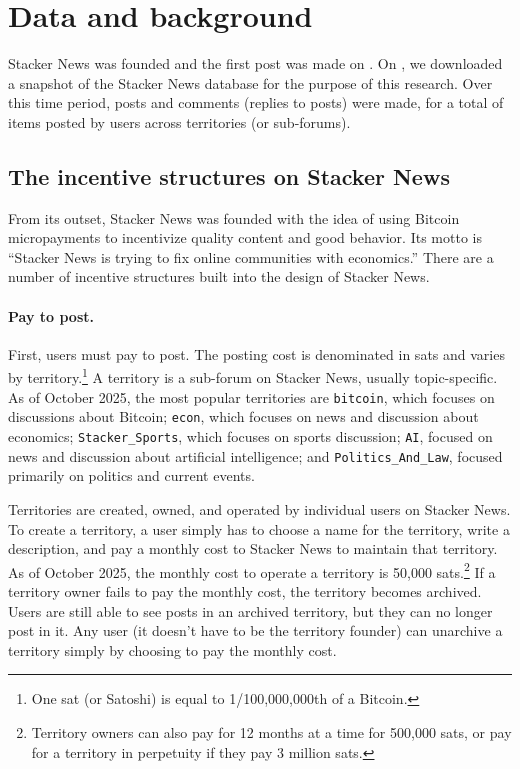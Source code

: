 \section{Data and background} \label{sec_data}

Stacker News was founded and the first post was made on . On , we downloaded a snapshot of the Stacker News database for the purpose of this research. Over this time period,  posts and  comments (replies to posts) were made, for a total of  items posted by  users across  territories (or sub-forums). 

\subsection*{The incentive structures on Stacker News}

From its outset, Stacker News was founded with the idea of using Bitcoin micropayments to incentivize quality content and good behavior. Its motto is ``Stacker News is trying to fix online communities with economics.'' There are a number of incentive structures built into the design of Stacker News. 

\paragraph{Pay to post.} First, users must pay to post. The posting cost is denominated in sats and varies by territory.\footnote{One sat (or Satoshi) is equal to 1/100,000,000th of a Bitcoin.} A territory is a sub-forum on Stacker News, usually topic-specific. As of October 2025, the most popular territories are \texttt{bitcoin}, which focuses on discussions about Bitcoin; \texttt{econ}, which focuses on news and discussion about economics; \texttt{Stacker\_Sports}, which focuses on sports discussion; \texttt{AI}, focused on news and discussion about artificial intelligence; and \texttt{Politics\_And\_Law}, focused primarily on politics and current events. 

Territories are created, owned, and operated by individual users on Stacker News. To create a territory, a user simply has to choose a name for the territory, write a description, and pay a monthly cost to Stacker News to maintain that territory. As of October 2025, the monthly cost to operate a territory is 50,000 sats.\footnote{Territory owners can also pay for 12 months at a time for 500,000 sats, or pay for a territory in perpetuity if they pay 3 million sats.} If a territory owner fails to pay the monthly cost, the territory becomes archived. Users are still able to see posts in an archived territory, but they can no longer post in it. Any user (it doesn't have to be the territory founder) can unarchive a territory simply by choosing to pay the monthly cost.

